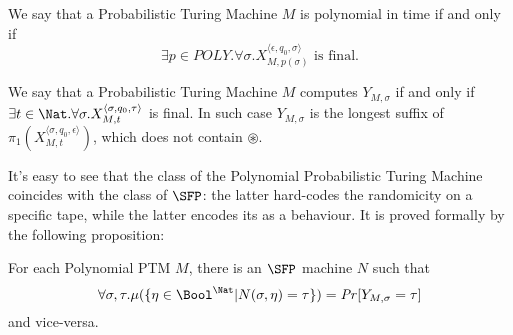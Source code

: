 \begin{defn}
We say that a Probabilistic Turing Machine $M$ is polynomial in time
if and only if
$$
\exists p\in POLY. \forall \sigma.X_{M, p(\sigma)}^{\langle \epsilon, q_0, \sigma\rangle}
\text{ is final}.
$$
\end{defn}

\begin{defn}
  \label{def:ptmY}
We say that a Probabilistic Turing Machine $M$ computes $Y_{M,\sigma}$ if and only if
$\exists t \in \Nat. \forall \sigma.X_{M, t}^{\langle \sigma, q_0, \tau\rangle}$ is final.
In such case $Y_{M,\sigma}$ is the longest suffix of
$\pi_1(X_{M, t}^{\langle \sigma, q_0, \epsilon\rangle})$, which does not contain $\circledast$.
\end{defn}

It's easy to see that the class of the Polynomial Probabilistic Turing Machine coincides with the class of $\SFP$: the latter hard-codes the randomicity on a specific tape, while the latter encodes its as a behaviour. It is proved formally by the following proposition:

























\begin{prop}
\label{prop:ptm=sfp}
For each Polynomial PTM $M$, there is an $\SFP$ machine $N$ such that
$$
\forall \sigma, \tau.\mu(\{\eta \in \Bool^\Nat| N(\sigma, \eta)= \tau\})=\mathit{Pr}[{Y_{M,\sigma}}=\tau]
$$
and vice-versa.
\end{prop}


